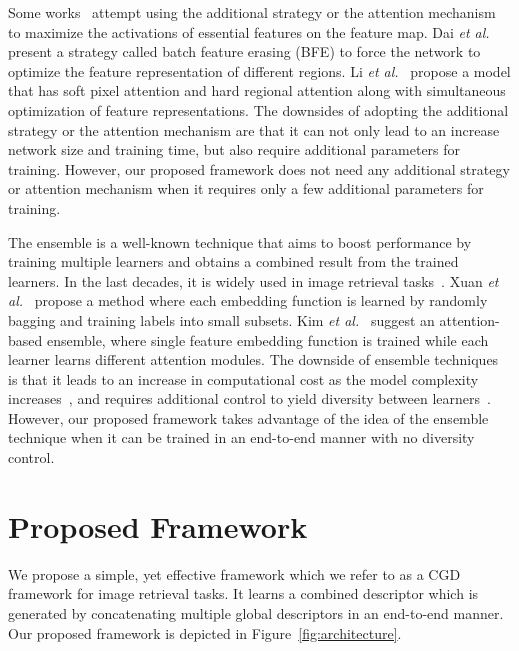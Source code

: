 \documentclass[10pt,twocolumn,letterpaper]{article}
\begin{document}
\begin{CJK}{UTF8}{mj}
Some works~\cite{dai2018batch, gu2018attention, li2018harmonious} attempt using the additional strategy or the attention mechanism to maximize the activations of essential features on the feature map.
Dai \textit{et al.}~\cite{dai2018batch} present a strategy called batch feature erasing (BFE) to force the network to optimize the feature representation of different regions.
Li \textit{et al.}~\cite{li2018harmonious} propose a model that has soft pixel attention and hard regional attention along with simultaneous optimization of feature representations.
The downsides of adopting the additional strategy or the attention mechanism are that it can not only lead to an increase network size and training time, but also require additional parameters for training.
However, our proposed framework does not need any additional strategy or attention mechanism when it requires only a few additional parameters for training.

The ensemble is a well-known technique that aims to boost performance by training multiple learners and obtains a combined result from the trained learners.
In the last decades, it is widely used in image retrieval tasks~\cite{Kim_2018_ECCV, opitz2017bier, Xuan_2018_ECCV, lin2018regional}.
Xuan \textit{et al.}~\cite{Xuan_2018_ECCV} propose a method where each embedding function is learned by randomly bagging and training labels into small subsets.
Kim \textit{et al.}~\cite{Kim_2018_ECCV} suggest an attention-based ensemble, where single feature embedding function is trained while each learner learns different attention modules.
The downside of ensemble techniques is that it leads to an increase in computational cost as the model complexity increases~\cite{zhu2018binary}, and requires additional control to yield diversity between learners~\cite{Kim_2018_ECCV, opitz2016efficient}.
However, our proposed framework takes advantage of the idea of the ensemble technique when it can be trained in an end-to-end manner with no diversity control.

\section{Proposed Framework}

We propose a simple, yet effective framework which we refer to as a CGD framework for image retrieval tasks.
It learns a combined descriptor which is generated by concatenating multiple global descriptors in an end-to-end manner.
Our proposed framework is depicted in Figure~\ref{fig:architecture}.


\end{CJK}
\end{document}
